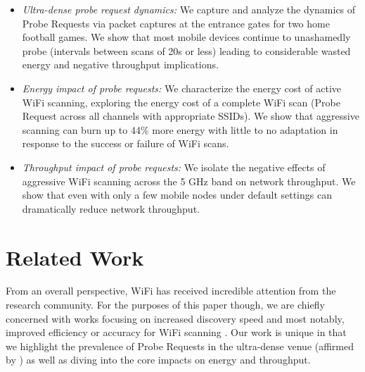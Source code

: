 \documentclass[conference]{IEEEtran}
\begin{document}
\begin{itemize}

\item \emph{Ultra-dense probe request dynamics:} We capture and analyze the dynamics of Probe Requests via packet captures at the entrance gates for two home football games.  We show that most mobile devices continue to unashamedly probe (intervals between scans of 20s or less) leading to considerable wasted energy and negative throughput implications.

\item \emph{Energy impact of probe requests:} We characterize the energy cost of active WiFi scanning, exploring the energy cost of a complete WiFi scan (Probe Request across all channels with appropriate SSIDs).  We show that aggressive scanning can burn up to 44\% more energy with little to no adaptation in response to the success or failure of WiFi scans.

\item \emph{Throughput impact of probe requests:} We isolate the negative effects of aggressive WiFi scanning across the 5 GHz band on network throughput.  We show that even with only a few mobile nodes under default settings can dramatically reduce network throughput.

\end{itemize}



\section {Related Work}
From an overall perspective, WiFi has received incredible attention from the research community. For the purposes of this paper though, we are chiefly concerned with works focusing on increased discovery speed \cite{Teng:INFOCOM09:DScan} and most notably, improved efficiency or accuracy for WiFi scanning \cite{Yeo:WiSe04:LANMonitor, Gupta:SECON07:WifiPhone, Raghavendra:TMC10:UnwantedLink, Rayanchu:NSDI12:WiFiNet,Cisco:Athens:80211ax}.  Our work is unique in that we highlight the prevalence of Probe Requests in the ultra-dense venue (affirmed by \cite{Cisco:Athens:80211ax}) as well as diving into the core impacts on energy and throughput.
\end{document}
